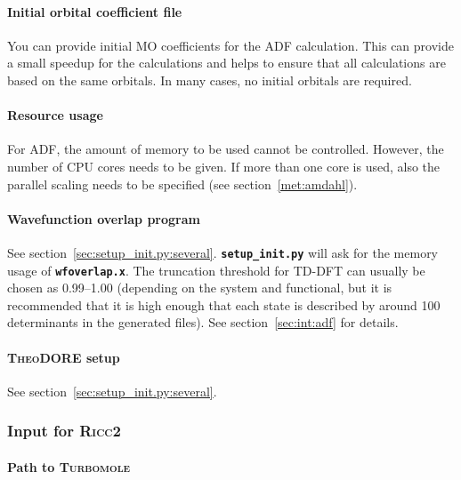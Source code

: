 \documentclass[a4paper,10pt,DIV=15,openany]{scrbook}
\newcommand{\ttt}[1]{\textbf{\texttt{#1}}}
\begin{document}
\paragraph{Initial orbital coefficient file}

You can provide initial MO coefficients for the \textsc{ADF} calculation. This can provide a small speedup for the calculations and helps to ensure that all calculations are based on the same orbitals.
In many cases, no initial orbitals are required.

\paragraph{Resource usage}

For \textsc{ADF}, the amount of memory to be used cannot be controlled. However, the number of CPU cores needs to be given. If more than one core is used, also the parallel scaling needs to be specified (see section~\ref{met:amdahl}).

\paragraph{Wavefunction overlap program}

See section~\ref{sec:setup_init.py:several}. \ttt{setup\_init.py} will ask for the memory usage of \ttt{wfoverlap.x}. The truncation threshold for TD-DFT can usually be chosen as 0.99--1.00 (depending on the system and functional, but it is recommended that it is high enough that each state is described by around 100 determinants in the generated files). See section~\ref{sec:int:adf} for details.

\paragraph{\textsc{TheoDORE} setup}

See section~\ref{sec:setup_init.py:several}. 


\subsubsection{Input for \textsc{Ricc2}}\label{sec:setup_init.py:ricc2}

\paragraph{Path to \textsc{Turbomole}}
\end{document}
